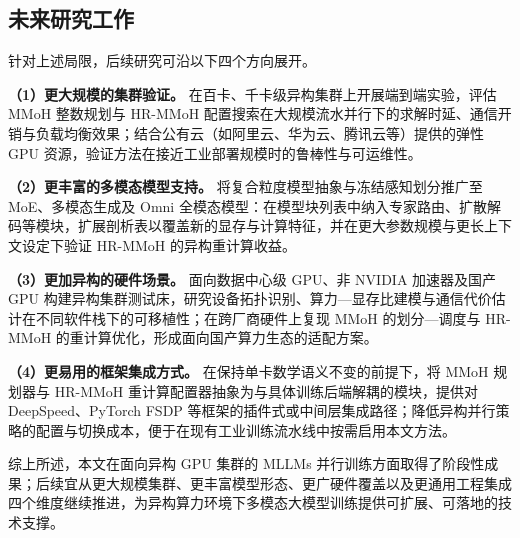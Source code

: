 \subsection{未来研究工作}

针对上述局限，后续研究可沿以下四个方向展开。

\textbf{（1）更大规模的集群验证。}
在百卡、千卡级异构集群上开展端到端实验，评估 MMoH 整数规划与 HR-MMoH 配置搜索在大规模流水并行下的求解时延、通信开销与负载均衡效果；结合公有云（如阿里云、华为云、腾讯云等）提供的弹性 GPU 资源，验证方法在接近工业部署规模时的鲁棒性与可运维性。

\textbf{（2）更丰富的多模态模型支持。}
将复合粒度模型抽象与冻结感知划分推广至 MoE、多模态生成及 Omni 全模态模型：在模型块列表中纳入专家路由、扩散解码等模块，扩展剖析表以覆盖新的显存与计算特征，并在更大参数规模与更长上下文设定下验证 HR-MMoH 的异构重计算收益。

\textbf{（3）更加异构的硬件场景。}
面向数据中心级 GPU、非 NVIDIA 加速器及国产 GPU 构建异构集群测试床，研究设备拓扑识别、算力—显存比建模与通信代价估计在不同软件栈下的可移植性；在跨厂商硬件上复现 MMoH 的划分—调度与 HR-MMoH 的重计算优化，形成面向国产算力生态的适配方案。

\textbf{（4）更易用的框架集成方式。}
在保持单卡数学语义不变的前提下，将 MMoH 规划器与 HR-MMoH 重计算配置器抽象为与具体训练后端解耦的模块，提供对 DeepSpeed、PyTorch FSDP 等框架的插件式或中间层集成路径；降低异构并行策略的配置与切换成本，便于在现有工业训练流水线中按需启用本文方法。

综上所述，本文在面向异构 GPU 集群的 MLLMs 并行训练方面取得了阶段性成果；后续宜从更大规模集群、更丰富模型形态、更广硬件覆盖以及更通用工程集成四个维度继续推进，为异构算力环境下多模态大模型训练提供可扩展、可落地的技术支撑。
